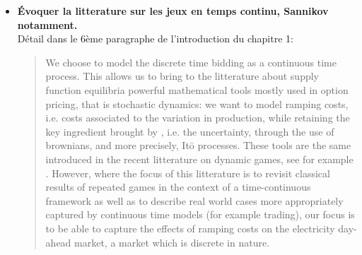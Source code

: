 \documentclass{article}
\begin{document}
\begin{itemize}

\item \textbf{Évoquer la litterature sur les jeux en temps continu, Sannikov notamment.}\\

Détail dans le 6ème paragraphe de l'introduction du chapitre 1:

\begin{quote}
We choose to model the discrete time bidding as a continuous time process.  This allows us to bring to the litterature about supply function equilibria powerful mathematical tools mostly used in option pricing, that is stochastic dynamics: we want to model ramping costs, i.e. costs associated to the variation in production, while retaining the key ingredient brought by \cite{KM}, i.e. the uncertainty, through the use of brownians, and more precisely, It\={o} processes. These tools are the same introduced in the recent litterature on dynamic games, see for example \cite{sannikov2016dynamic}. However, where the focus of this litterature is to revisit classical results of repeated games in the context of a time-continuous framework as well as to describe real world cases more appropriately captured by continuous time models (for example trading), our focus is to be able to capture the effects of ramping costs on the electricity day-ahead market, a market which is discrete in nature.
\end{quote}

\end{itemize}
\end{document}
